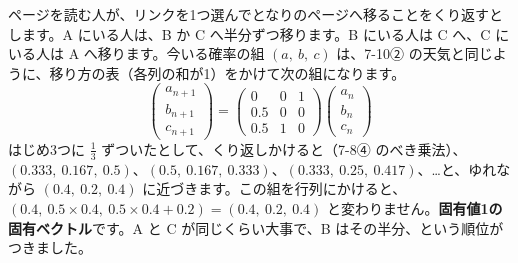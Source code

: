 \medskip
ページを読む人が、リンクを1つ選んでとなりのページへ移ることをくり返すとします。A にいる人は、B か C へ半分ずつ移ります。B にいる人は C へ、C にいる人は A へ移ります。今いる確率の組 $(a,\ b,\ c)$ は、7-10② の天気と同じように、移り方の表（各列の和が1）をかけて次の組になります。
\[ \begin{pmatrix}a_{n+1}\\b_{n+1}\\c_{n+1}\end{pmatrix}=\begin{pmatrix}0&0&1\\0.5&0&0\\0.5&1&0\end{pmatrix}\begin{pmatrix}a_n\\b_n\\c_n\end{pmatrix} \]
はじめ3つに $\frac13$ ずついたとして、くり返しかけると（7-8④ のべき乗法）、$(0.333,\ 0.167,\ 0.5)$、$(0.5,\ 0.167,\ 0.333)$、$(0.333,\ 0.25,\ 0.417)$、…と、ゆれながら $(0.4,\ 0.2,\ 0.4)$ に近づきます。この組を行列にかけると、$(0.4,\ 0.5\times0.4,\ 0.5\times0.4+0.2)=(0.4,\ 0.2,\ 0.4)$ と変わりません。\textbf{固有値1の固有ベクトル}です。A と C が同じくらい大事で、B はその半分、という順位がつきました。


